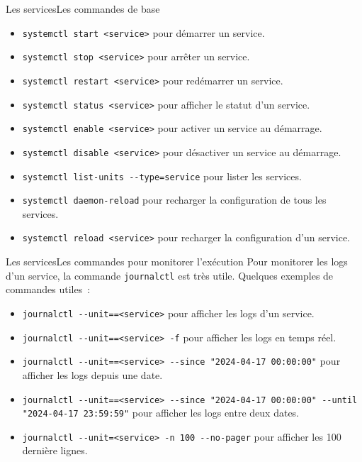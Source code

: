 \documentclass{beamer}
\begin{document}
    \begin{frame}{Les services}{Les commandes de base}
        \begin{itemize}
            \item \lstinline{systemctl start <service>} pour démarrer un service.
            \item \lstinline{systemctl stop <service>} pour arrêter un service.
            \item \lstinline{systemctl restart <service>} pour redémarrer un service.
            \item \lstinline{systemctl status <service>} pour afficher le statut d'un service.
            \item \lstinline{systemctl enable <service>} pour activer un service au démarrage.
            \item \lstinline{systemctl disable <service>} pour désactiver un service au démarrage.
            \item \lstinline{systemctl list-units --type=service} pour lister les services.
            \item \lstinline{systemctl daemon-reload} pour recharger la configuration de tous les services.
            \item \lstinline{systemctl reload <service>} pour recharger la configuration d'un service.
        \end{itemize}
    \end{frame}

    \begin{frame}{Les services}{Les commandes pour monitorer l'exécution}
        Pour monitorer les logs d'un service, la commande \lstinline{journalctl} est très utile.
        \bigbreak
        Quelques exemples de commandes utiles~:
        \begin{itemize}
            \item \lstinline{journalctl --unit==<service>} pour afficher les logs d'un service.
            \item \lstinline{journalctl --unit==<service> -f} pour afficher les logs en temps réel.
            \item \lstinline{journalctl --unit==<service> --since "2024-04-17 00:00:00"} pour afficher les logs depuis une date.
            \item \lstinline{journalctl --unit==<service> --since "2024-04-17 00:00:00" --until "2024-04-17 23:59:59"} pour afficher les logs entre deux dates.
            \item \lstinline{journalctl --unit=<service> -n 100 --no-pager} pour afficher les 100 dernière lignes.
        \end{itemize}
    \end{frame}
\end{document}
